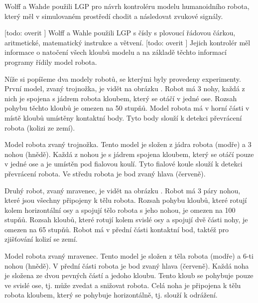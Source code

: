 Wolff a Wahde použili LGP pro návrh kontroléru modelu humanoidního robota, který měl v simulovaném prostředí chodit a následovat zvukové signály.

[todo: overit ] Wolff a Wahle použili LGP s čísly s plovoucí řádovou čárkou, aritmetické, matematický instrukce a větvení.
[todo: overit ] Jejich kontrolér měl informace o natočení všech kloubů modelu a na základě těchto informací programy řídily model robota.




Níže si popíšeme dva modely robotů, se kterými byly provedeny experimenty.
První model, zvaný trojnožka, je vidět na obrázku .
Robot má 3 nohy, každá z nich je spojena s jádrem robota kloubem, který se otáčí v jedné ose.
Rozsah pohybu těchto kloubů je omezen na 50 stupňů.
Model robota má v horní části v místě kloubů umístěny kontaktní body.
Tyto body slouží k detekci převrácení robota (kolizi ze zemí).

Model robota zvaný trojnožka.
Tento model je složen z jádra robota (modře) a 3 nohou (hnědě).
Každá z nohou je s jádrem spojena kloubem, který se otáčí pouze v jedné ose a je umístěn pod fialovou koulí.
Tyto fialové koule slouží k detekci převrácení robota.
Ve středu robota je bod zvaný hlava (červeně).

Druhý robot, zvaný mravenec, je vidět na obrázku .
Robot má 3 páry nohou, které jsou všechny připojeny k tělu robota.
Rozsah pohybu kloubů, které rotují kolem horizontální osy a spojují tělo robota s jeho nohou, je omezen na 100 stupňů.
Rozsah kloubů, které rotují kolem svislé osy a spojují dvě části nohy, je omezen na 65 stupňů.
Robot má v přední části kontaktní bod, taktéž pro zjišťování kolizí se zemí.

Model robota zvaný mravenec.
Tento model je složen z těla robota (modře) a 6-ti nohou (hnědě).
V přední části robota je bod zvaný hlava (červeně).
Každá noha je složena ze dvou pevných částí a jedoho kloubu.
Tento kloub se pohybuje pouze ve svislé ose, tj. může zvedat a snižovat robota.
Celá noha je připojena k tělu robota kloubem, který se pohybuje horizontálně, tj. slouží k odrážení.


